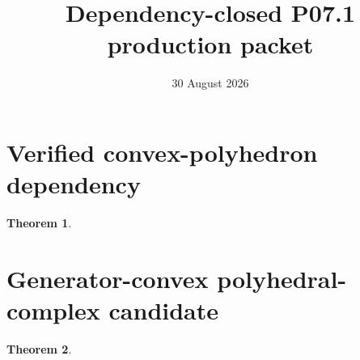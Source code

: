 \documentclass[11pt]{article}
\newtheorem{theorem}{Theorem}
\begin{document}
\title{Dependency-closed P07.1 production packet}
\author{}
\date{30 August 2026}
\maketitle

\section*{Verified convex-polyhedron dependency}
\begin{theorem}

\end{theorem}


\section*{Generator-convex polyhedral-complex candidate}
\begin{theorem}

\end{theorem}

\end{document}
